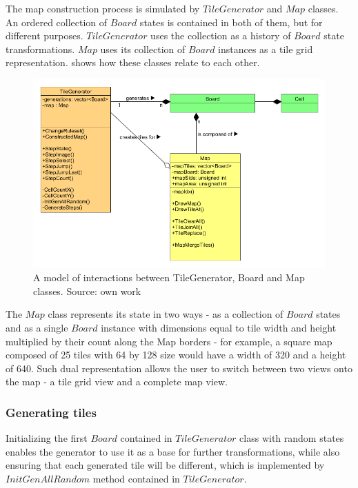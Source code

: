 \documentclass[12pt]{report}
\begin{document}
The map construction process is simulated by $TileGenerator$ and $Map$ classes. An ordered collection of $Board$ states is contained in both of them, but for different purposes. $TileGenerator$ uses the collection as a history of $Board$ state transformations. $Map$ uses its collection of $Board$ instances as a tile grid representation.  shows how these classes relate to each other.

\begin{figure}[H]
	\centering
	\includegraphics[width=0.9\linewidth]{diagrams/tilegenerator_map}
	\caption{ A model of interactions between TileGenerator, Board and Map classes. Source: own work}
	\label{fig:tilegeneratormap}
\end{figure}

The $Map$ class represents its state in two ways - as a collection of $Board$ states and as a single $Board$ instance with dimensions equal to tile width and height multiplied by their count along the Map borders - for example, a square map composed of 25 tiles with 64 by 128 size would have a width of 320 and a height of 640. Such dual representation allows the user to switch between two views onto the map - a tile grid view and a complete map view.

\subsubsection{Generating tiles}

Initializing the first $Board$ contained in $TileGenerator$ class with random states enables the generator to use it as a base for further transformations, while also ensuring that each generated tile will be different, which is implemented by $InitGenAllRandom$ method contained in $TileGenerator$. 
{\tiny }

\end{document}
